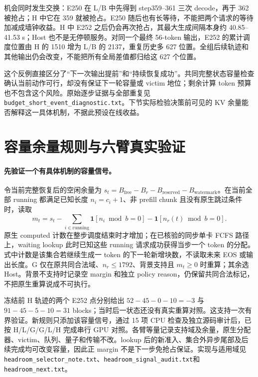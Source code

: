 \documentclass[UTF8,fontset=fandol,a4paper,10pt]{ctexart}
\newcommand{\code}[1]{\nolinkurl{#1}}
\begin{document}
机会同时发生交换：E250 在 L/B 中先得到 step359--361 三次 decode，再于 362 被抢占；H 中它在 359 就被抢占。E250 随后也有长等待，不能把两个请求的等待加减成墙钟收益。H 中 E252 之后仍会再次抢占，其最大生成间隔本身约 40.85--41.53 s；Host 也不是无停顿服务。对同一个最终 56-token 输出，E252 的累计调度位置由 H 的 1510 增为 L/B 的 2137，重复历史多 627 位置。全组后续轨迹和其他输出仍会改变，不能把所有全局差值都归给这 627 个位置。

这个反例直接区分了“下一次输出提前”和“持续恢复成功”。共同完整状态容量检查确认当前动作可行，却没有保证下一轮容量或 victim 地位；剩余计算 token 预算也不包含这个风险。原始逐步证据与全部重复见\code{budget_short_event_diagnostic.txt}。下节实际检验决策前可见的 KV 余量能否解释这一具体机制，不据此预设在线收益。

\section{容量余量规则与六臂真实验证}
\label{sec:multinews320-next}

\paragraph{先验证一个有具体机制的容量信号。}
令当前完整恢复后的空闲余量为 $s_t=B_{\mathrm{free}}-B_r-B_{\mathrm{reserved}}-B_{\mathrm{watermark}}$。在当前全部 running 都满足已知长度 $n_i=c_i+1$、非 prefill chunk 且没有原生跳过条件时，读取
\begin{equation}
 m_t=s_t-\sum_{i\in\mathrm{running}}\mathbf1[n_i\bmod b=0]
           -\mathbf1[n_r(t)\bmod b=0].
\end{equation}
原生 computed 计数在整步调度结束时才增加；在已核验的同步单卡 FCFS 路径上，waiting lookup 此时已知这些 running 请求成功获得当步一个 token 的分配。式中计数是该集合若继续生成一 token 的下一轮新增块数，不读取未来 EOS 或输出长度。G 仅在原共同合法域、$n_r\le1792$、背景支持且 $m_t\ge0$ 时重算；其余选 Host。背景不支持时记录空 margin 和独立 policy reason，仍保留共同合法标记，不把原生重算说成不可执行。

冻结前 H 轨迹的两个 E252 点分别给出 $52-45-0-10=-3$ 与 $91-45-5-10=31$ blocks；当时后一状态还没有真实重算对照。这支持一次有界验证。新规则只添加该容量信号，通过 15 项 CPU 检查及独立源码审计后，已按 H/L/G/G/L/H 完成串行 GPU 对照。各臂等量记录支持域及余量，原生分配器、victim、队列、量子和传输不改。lookup 后的新准入、集合外异步尾部及后续完成均可改变容量，因此正 margin 不是下一步免抢占保证。实现与适用域见\code{headroom_selector_note.txt}、\code{headroom_signal_audit.txt}和\code{headroom_next.txt}。
\end{document}

